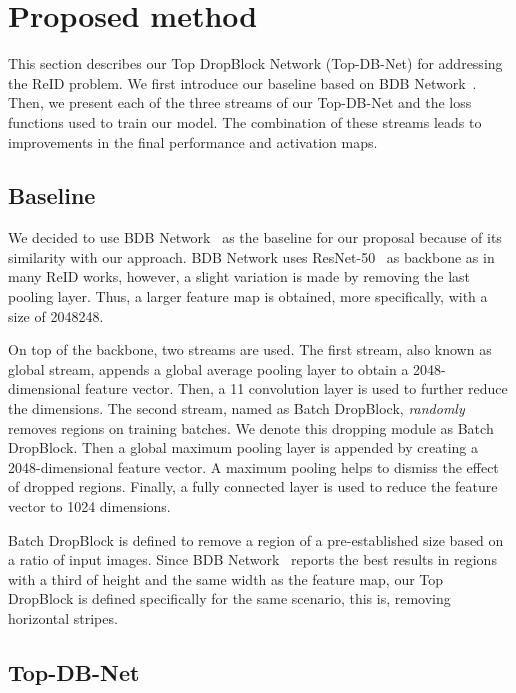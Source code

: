 \documentclass[a4paper,conference]{IEEEtran}
\begin{document}
\section{Proposed method}
\label{sec:method}
 
This section describes our Top DropBlock Network (Top-DB-Net) for addressing the ReID problem. We first introduce our baseline based on BDB Network~\cite{dai2019batch}. Then, we present each of the three streams of our Top-DB-Net and the loss functions used to train our model. The combination of these streams leads to improvements in the final performance and activation maps.
 
\subsection{Baseline}
 
We decided to use BDB Network~\cite{dai2019batch} as the baseline for our proposal because of its similarity with our approach. BDB Network uses ResNet-50~\cite{he2016deep} as backbone as in many ReID works, however, a slight variation is made by removing the last pooling layer. Thus, a larger feature map is obtained, more specifically, with a size of 2048248.
 
On top of the backbone, two streams are used. The first stream, also known as global stream, appends a global average pooling layer to obtain a 2048-dimensional feature vector. Then, a 11 convolution layer is used to further reduce the dimensions. The second stream, named as Batch DropBlock, \textit{randomly} removes regions on training batches. We denote this dropping module as Batch DropBlock. Then a global maximum pooling layer is appended by creating a 2048-dimensional feature vector. A maximum pooling helps to dismiss the effect of dropped regions. Finally, a fully connected layer is used to reduce the feature vector to 1024 dimensions.
 
Batch DropBlock is defined to remove a region of a pre-established size based on a ratio of input images. Since BDB Network~\cite{dai2019batch} reports the best results in regions with a third of height and the same width as the feature map, our Top DropBlock is defined specifically for the same scenario, this is, removing horizontal stripes.
 
\subsection{Top-DB-Net}
\end{document}
